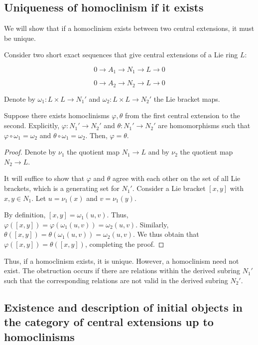 \subsection{Uniqueness of homoclinism if it exists}

We will show that if a homoclinism exists between two central
extensions, it must be unique.

\begin{lemma}\label{lemma:uniqueness-of-homoclinism-lie}
  Consider two short exact sequences that give central extensions of a Lie ring $L$:

  $$0 \to A_1 \to N_1 \to L \to 0$$

  $$0 \to A_2 \to N_2 \to L \to 0$$

  Denote by $\omega_1:L \times L \to N_1'$ and $\omega_2:L \times L
  \to N_2'$ the Lie bracket maps.

  Suppose there exists homoclinisms $\varphi,\theta$ from the first
  central extension to the second. Explicitly, $\varphi:N_1' \to N_2'$
  and $\theta:N_1' \to N_2'$ are homomorphisms such that $\varphi
  \circ \omega_1 = \omega_2$ and $\theta \circ \omega_1 =
  \omega_2$. Then, $\varphi = \theta$.
\end{lemma}

\begin{proof}
  Denote by $\nu_1$ the quotient map $N_1 \to L$ and by $\nu_2$ the
  quotient map $N_2 \to L$.

  It will suffice to show that $\varphi$ and $\theta$ agree with each
  other on the set of all Lie brackets, which is a generating set for
  $N_1'$. Consider a Lie bracket $[x,y]$ with $x,y \in N_1$. Let $u =
  \nu_1(x)$ and $v = \nu_1(y)$. 

  By definition, $[x,y] = \omega_1(u,v)$. Thus, $\varphi([x,y]) =
  \varphi(\omega_1(u,v)) = \omega_2(u,v)$. Similarly, $\theta([x,y]) =
  \theta(\omega_1(u,v)) = \omega_2(u,v)$. We thus obtain that
  $\varphi([x,y]) = \theta([x,y])$, completing the proof.
\end{proof}

Thus, if a homoclinism exists, it is unique. However, a homoclinism
need not exist. The obstruction occurs if there are relations within
the derived subring $N_1'$ such that the corresponding relations are
not valid in the derived subring $N_2'$.

\subsection{Existence and description of initial objects in the category of central extensions up to homoclinisms}

